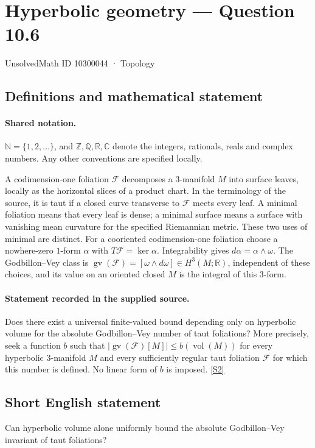 \documentclass[11pt]{article}
\newcommand{\sref}[2]{\hyperlink{source:#1:#2}{[S#2]}}
\begin{document}
\setcounter{section}{10300043}
\section{Hyperbolic geometry — Question 10.6}\label{10300044}
{\small\sffamily UnsolvedMath ID 10300044 · Topology}
\subsection{Definitions and mathematical statement}

\paragraph{Shared notation.}$\mathbb N=\{1,2,\ldots\}$, and $\mathbb Z,\mathbb Q,\mathbb R,\mathbb C$ denote the integers, rationals, reals and complex numbers. Any other conventions are specified locally.


A codimension-one foliation $\mathcal F$ decomposes a $3$-manifold $M$ into surface leaves, locally as the horizontal slices of a product chart. In the terminology of the source, it is taut if a closed curve transverse to $\mathcal F$ meets every leaf. A minimal foliation means that every leaf is dense; a minimal surface means a surface with vanishing mean curvature for the specified Riemannian metric. These two uses of minimal are distinct. For a cooriented codimension-one foliation choose a nowhere-zero $1$-form $\alpha$ with $T\mathcal F=\ker\alpha$. Integrability gives $d\alpha=\alpha\wedge\omega$. The Godbillon--Vey class is $\operatorname{gv}(\mathcal F)=[\omega\wedge d\omega]\in H^3(M;\mathbb R)$, independent of these choices, and its value on an oriented closed $M$ is the integral of this $3$-form.
\paragraph{Statement recorded in the supplied source.}
Does there exist a universal finite-valued bound depending only on hyperbolic volume for the absolute Godbillon--Vey number of taut foliations? More precisely, seek a function $b$ such that $|\operatorname{gv}(\mathcal F)[M]|\le b(\operatorname{vol}(M))$ for every hyperbolic $3$-manifold $M$ and every sufficiently regular taut foliation $\mathcal F$ for which this number is defined. No linear form of $b$ is imposed. \sref{10300044}{2}
\subsection{Short English statement}
Can hyperbolic volume alone uniformly bound the absolute Godbillon--Vey invariant of taut foliations?
\end{document}
